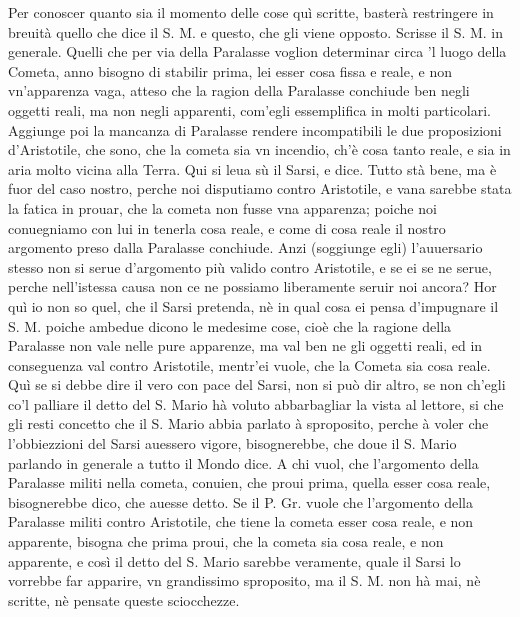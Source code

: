 \documentclass[11pt,twoside,openany]{book}
\begin{document}
Per conoscer quanto sia il momento delle cose quì scritte, basterà restringere in breuità quello che dice il S. M. e questo, che gli viene opposto. Scrisse il S. M. in generale. Quelli che per via della Paralasse voglion determinar circa 'l luogo della Cometa, anno bisogno di stabilir prima, lei esser cosa fissa e reale, e non vn'apparenza vaga, atteso che la ragion della Paralasse conchiude ben negli oggetti reali, ma non negli apparenti, com'egli essemplifica in molti particolari. Aggiunge poi la mancanza di Paralasse rendere incompatibili le due proposizioni d'Aristotile, che sono, che la cometa sia vn incendio, ch'è cosa tanto reale, e sia in aria molto vicina alla Terra. Qui si leua sù il Sarsi, e dice. Tutto stà bene, ma è fuor del caso nostro, perche noi disputiamo contro Aristotile, e vana sarebbe stata la fatica in prouar, che la cometa non fusse vna apparenza; poiche noi conuegniamo con lui in tenerla cosa reale, e come di cosa reale il nostro argomento preso dalla Paralasse conchiude. Anzi (soggiunge egli) l'auuersario stesso non si serue d'argomento più valido contro Aristotile, e se ei se ne serue, perche nell'istessa causa non ce ne possiamo liberamente seruir noi ancora? Hor quì io non so quel, che il Sarsi pretenda, nè in qual cosa ei pensa d'impugnare il S. M. poiche ambedue dicono le medesime cose, cioè che la ragione della Paralasse non vale nelle pure apparenze, ma val ben ne gli oggetti reali, ed in conseguenza val contro Aristotile, mentr'ei vuole, che la Cometa sia cosa reale. Quì se si debbe dire il vero con pace del Sarsi, non si può dir altro, se non ch'egli co'l palliare il detto del S. Mario hà voluto abbarbagliar la vista al lettore, si che gli resti concetto che il S. Mario abbia parlato à sproposito, perche à voler che l'obbiezzioni del Sarsi auessero vigore, bisognerebbe, che doue il S. Mario parlando in generale a tutto il Mondo dice. A chi vuol, che l'argomento della Paralasse militi nella cometa, conuien, che proui prima, quella esser cosa reale, bisognerebbe dico, che auesse detto. Se il P. Gr. vuole che l'argomento della Paralasse militi contro Aristotile, che tiene la cometa esser cosa reale, e non apparente, bisogna che prima proui, che la cometa sia cosa reale, e non apparente, e così il detto del S. Mario sarebbe veramente, quale il Sarsi lo vorrebbe far apparire, vn grandissimo sproposito, ma il S. M. non hà mai, nè scritte, nè pensate queste sciocchezze.
\end{document}
